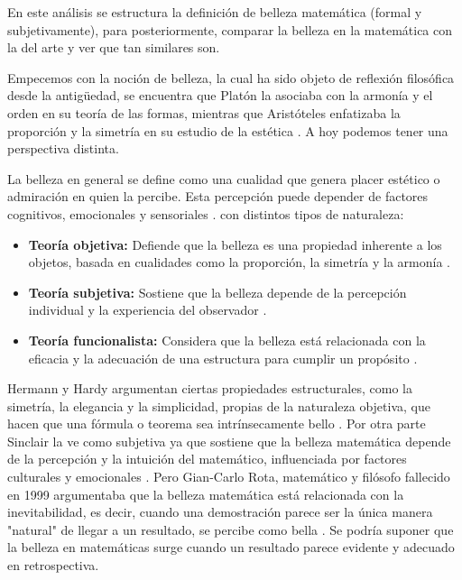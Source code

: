 \documentclass[twocolumn]{article}
\begin{document}
En este análisis se estructura la definición de belleza matemática (formal y subjetivamente), para posteriormente, comparar la belleza en la matemática con la del arte y ver que tan similares son. 


Empecemos con la noción de belleza, la cual ha sido objeto de reflexión filosófica desde la antigüedad, se encuentra que Platón la asociaba con la armonía y el orden en su teoría de las formas, mientras que Aristóteles enfatizaba la proporción y la simetría en su estudio de la estética \cite{platon_republic, aristoteles_poetica}. A hoy podemos tener una perspectiva distinta.

La belleza en general se define como una cualidad que genera placer estético o admiración en quien la percibe. Esta percepción puede depender de factores cognitivos, emocionales y sensoriales \cite{tatarkiewicz2005}. con distintos tipos de naturaleza:

\begin{itemize}
    \item \textbf{Teoría objetiva:} Defiende que la belleza es una propiedad inherente a los objetos, basada en cualidades como la proporción, la simetría y la armonía \cite{eco1987}.
    \item \textbf{Teoría subjetiva:} Sostiene que la belleza depende de la percepción individual y la experiencia del observador \cite{kant1790}.
    \item \textbf{Teoría funcionalista:} Considera que la belleza está relacionada con la eficacia y la adecuación de una estructura para cumplir un propósito \cite{gombrich1969}.
\end{itemize}


\vspace{3}

 
 Hermann y Hardy argumentan ciertas propiedades estructurales, como la simetría, la elegancia y la simplicidad, propias de la naturaleza objetiva, que hacen que una fórmula o teorema sea intrínsecamente bello \cite{hardy1940, weyl1952}. Por otra parte Sinclair la ve como subjetiva ya que sostiene que la belleza matemática depende de la percepción y la intuición del matemático, influenciada por factores culturales y emocionales \cite{sinclair2006}. Pero Gian-Carlo Rota, matemático y filósofo fallecido en 1999 argumentaba que la belleza matemática está relacionada con la inevitabilidad, es decir, cuando una demostración parece ser la única manera "natural" de llegar a un resultado, se percibe como bella \cite{rota1997}. Se podría suponer que la belleza en matemáticas surge cuando un resultado parece evidente y adecuado en retrospectiva.
\end{document}
